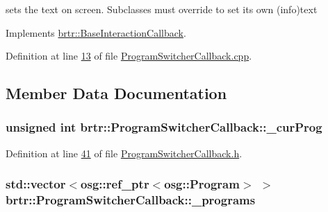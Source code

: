 sets the text on screen. Subclasses must override to set its own (info)text 



Implements \hyperlink{classbrtr_1_1_base_interaction_callback_a0fe57e329f044e21d49041c861435ad8}{brtr\+::\+Base\+Interaction\+Callback}.



Definition at line \hyperlink{_program_switcher_callback_8cpp_source_l00013}{13} of file \hyperlink{_program_switcher_callback_8cpp_source}{Program\+Switcher\+Callback.\+cpp}.



\subsection{Member Data Documentation}
\hypertarget{classbrtr_1_1_program_switcher_callback_a06ee6d68fe703e6a88960219b019f1bd}{
\subsubsection[{\+\_\+cur\+Prog}]{\setlength{\rightskip}{0pt plus 5cm}unsigned int brtr\+::\+Program\+Switcher\+Callback\+::\+\_\+cur\+Prog\hspace{0.3cm}{\ttfamily [private]}}}\label{classbrtr_1_1_program_switcher_callback_a06ee6d68fe703e6a88960219b019f1bd}


Definition at line \hyperlink{_program_switcher_callback_8h_source_l00041}{41} of file \hyperlink{_program_switcher_callback_8h_source}{Program\+Switcher\+Callback.\+h}.

\hypertarget{classbrtr_1_1_program_switcher_callback_a9cbcf4d65f6ee468bb20d16b9e795e49}{
\subsubsection[{\+\_\+programs}]{\setlength{\rightskip}{0pt plus 5cm}std\+::vector$<$osg\+::ref\+\_\+ptr$<$osg\+::\+Program$>$ $>$ brtr\+::\+Program\+Switcher\+Callback\+::\+\_\+programs\hspace{0.3cm}{\ttfamily [private]}}}\label{classbrtr_1_1_program_switcher_callback_a9cbcf4d65f6ee468bb20d16b9e795e49}


